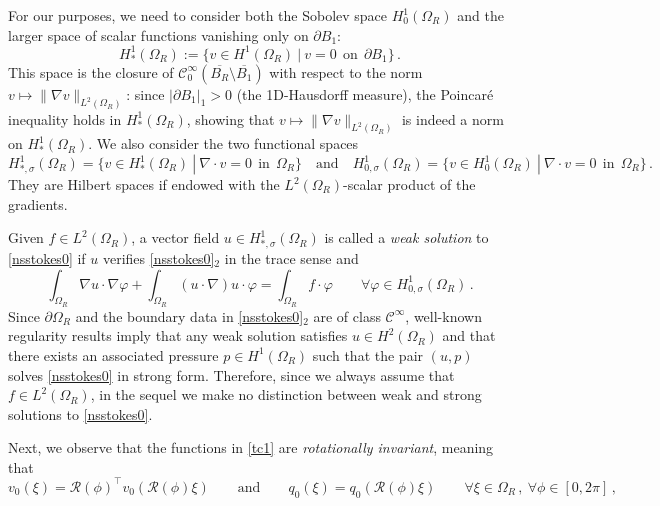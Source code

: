 \documentclass[a4paper,11pt]{article}
\numberwithin{equation}{section}
\numberwithin{figure}{section}
\begin{document}
For our purposes, we need to consider both the Sobolev space $H_{0}^{1}(\Omega_{R})$ and the larger space of scalar functions vanishing only on
$\partial B_{1}$:
$$
H^1_*(\Omega_{R}) := \{v\in H^1(\Omega_{R}) \ | \ v=0 \ \ \mbox{on} \ \ \partial B_{1}\}\, .
$$
This space is the closure of $\mathcal{C}^{\infty}_{0}(\overline{B_{R}}\setminus\overline{B_{1}})$ with respect to the norm $v\mapsto\|\nabla
v\|_{L^2(\Omega_{R})}$: since $|\partial B_{1}|_{1}>0$ (the 1D-Hausdorff measure),
the Poincaré inequality holds in $H^1_*(\Omega_{R})$, showing that $v\mapsto\|\nabla v\|_{L^2(\Omega_{R})}$ is indeed a norm on $H^1_*(\Omega_{R})$. We also consider the two functional spaces
$$
H^{1}_{*,\sigma}(\Omega_{R}) = \{ v \in H^1_*(\Omega_{R}) \ | \ \nabla \cdot v = 0 \ \ \text{in} \ \ \Omega_{R} \} \quad \text{and} \quad
H^{1}_{0,\sigma}(\Omega_{R}) = \{ v \in H^{1}_{0}(\Omega_{R}) \ | \ \nabla \cdot v = 0 \ \ \text{in} \ \ \Omega_{R} \} \, .
$$
They are Hilbert spaces if endowed with the $L^{2}(\Omega_{R})$-scalar product of the gradients.\par
Given $f \in L^{2}(\Omega_{R})$, a vector field $u\in H^{1}_{*,\sigma}(\Omega_{R})$ is called a \textit{weak solution} to \eqref{nsstokes0} if $u$
verifies \eqref{nsstokes0}$_2$ in the trace sense and
\begin{equation} \label{nstokesdebil}
\int_{\Omega_{R}} \nabla u \cdot \nabla \varphi + \int_{\Omega_{R}} (u \cdot \nabla) u \cdot \varphi  = \int_{\Omega_{R}} f \cdot \varphi \qquad
\forall \varphi \in H^{1}_{0,\sigma}(\Omega_{R}) \, .
\end{equation}	
Since $\partial \Omega_{R}$ and the boundary data in \eqref{nsstokes0}$_2$ are of class $\mathcal{C}^{\infty}$, well-known regularity results
\cite[Theorem IX.5.2]{galdi2011introduction} imply that any weak solution satisfies $u \in H^{2}(\Omega_{R})$ and that there exists an
associated pressure
$p \in H^{1}(\Omega_{R})$ such that the pair $(u,p)$ solves \eqref{nsstokes0} in strong form. Therefore, since we always assume that $f\in
L^2(\Omega_R)$,
in the sequel we make no distinction between weak and strong solutions to \eqref{nsstokes0}.\par
Next, we observe that the functions in \eqref{tc1} are \textit{rotationally invariant}, meaning that
\begin{equation} \label{rotinvariant}
v_{0}(\xi) = \mathcal{R}(\phi)^{\top} v_{0}(\mathcal{R}(\phi) \xi) \qquad \text{and} \qquad q_{0}(\xi) = q_{0}(\mathcal{R}(\phi) \xi) \qquad
\forall \xi \in \Omega_{R} \, , \ \forall \phi \in [0, 2\pi] \, ,
\end{equation}
\end{document}

